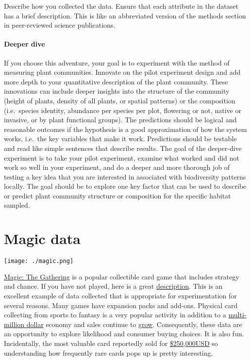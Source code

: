 \documentclass[
]{book}
\begin{document}
Describe how you collected the data. Ensure that each attribute in the dataset has a brief description. This is like an abbreviated version of the methods section in peer-reviewed science publications.

\hypertarget{deeper-dive-2}{%
\subsubsection*{Deeper dive}\label{deeper-dive-2}}

If you choose this adventure, your goal is to experiment with the method of measuring plant communities. Innovate on the pilot experiment design and add more depth to your quantitative description of the plant community. These innovations can include deeper insights into the structure of the community (height of plants, density of all plants, or spatial patterns) or the composition (i.e.~species identity, abundance per species per plot, flowering or not, native or invasive, or by plant functional groups). The predictions should be logical and reasonable outcomes if the hypothesis is a good approximation of how the system works, i.e.~the key variables that make it work. Predictions should be testable and read like simple sentences that describe results. The goal of the deeper-dive experiment is to take your pilot experiment, examine what worked and did not work so well in your experiment, and do a deeper and more thorough job of testing a key idea that you are interested in associated with biodiversity patterns locally. The goal should be to explore one key factor that can be used to describe or predict plant community structure or composition for the specific habitat sampled.

\hypertarget{magic}{%
\chapter{Magic data}\label{magic}}

\texttt{[image: ./magic.png]}

\href{https://magic.wizards.com/en}{Magic: The Gathering} is a popular collectible card game that includes strategy and chance. If you have not played, here is a great \href{https://en.wikipedia.org/wiki/Magic:_The_Gathering}{description}. This is an excellent example of data collected that is appropriate for experimentation for several reasons. Many games have expansion packs and add-ons. Physical card collecting from sports to fantasy is a very popular activity in addition to a \href{https://www.nytimes.com/2018/03/23/your-money/trading-cards-investment.html}{multi-million dollar} economy and sales continue to \href{https://www.forbes.com/sites/chriscason/2020/05/28/why-the-sports-card-industry-has-not-yet-reached-its-peak/\#763af2e31fb7}{grow}. Consequently, these data are an opportunity to explore likelihood and consumer buying choices. It is also fun. Incidentally, the most valuable card reportedly sold for \href{https://screenrant.com/magic-the-gathering-most-rare-expensive-valuable-cards/}{\$250,000USD} so understanding how frequently rare cards pops up is pretty interesting.
\end{document}
